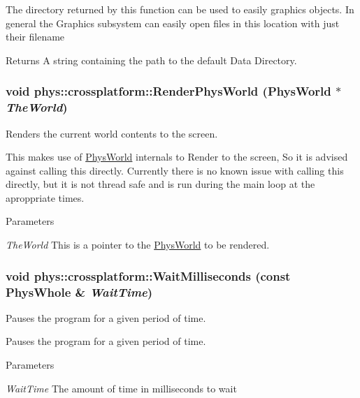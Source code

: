 The directory returned by this function can be used to easily graphics objects. In general the Graphics subsystem can easily open files in this location with just their filename \begin{DoxyReturn}{Returns}
A string containing the path to the default Data Directory. 
\end{DoxyReturn}
\hypertarget{namespacephys_1_1crossplatform_a2025b17e592096a6fbb6d24619138c71}{
\subsubsection[{RenderPhysWorld}]{\setlength{\rightskip}{0pt plus 5cm}void phys::crossplatform::RenderPhysWorld ({\bf PhysWorld} $\ast$ {\em TheWorld})}}
\label{d4/d59/namespacephys_1_1crossplatform_a2025b17e592096a6fbb6d24619138c71}


Renders the current world contents to the screen. 

This makes use of \hyperlink{classPhysWorld}{PhysWorld} internals to Render to the screen, So it is advised against calling this directly. Currently there is no known issue with calling this directly, but it is not thread safe and is run during the main loop at the aproppriate times. 
\begin{DoxyParams}{Parameters}
\item[{\em TheWorld}]This is a pointer to the \hyperlink{classPhysWorld}{PhysWorld} to be rendered. \end{DoxyParams}
\hypertarget{namespacephys_1_1crossplatform_aeecd8627f86a826cc1ad55bf45b11757}{
\subsubsection[{WaitMilliseconds}]{\setlength{\rightskip}{0pt plus 5cm}void phys::crossplatform::WaitMilliseconds (const PhysWhole \& {\em WaitTime})}}
\label{d4/d59/namespacephys_1_1crossplatform_aeecd8627f86a826cc1ad55bf45b11757}


Pauses the program for a given period of time. 

Pauses the program for a given period of time. 
\begin{DoxyParams}{Parameters}
\item[{\em WaitTime}]The amount of time in milliseconds to wait \end{DoxyParams}
